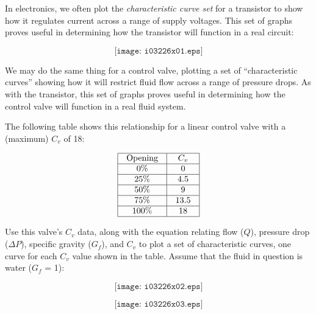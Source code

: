 

In electronics, we often plot the {\it characteristic curve set} for a transistor to show how it regulates current across a range of supply voltages.  This set of graphs proves useful in determining how the transistor will function in a real circuit:

$$\texttt{[image: i03226x01.eps]}$$

We may do the same thing for a control valve, plotting a set of ``characteristic curves'' showing how it will restrict fluid flow across a range of pressure drops.  As with the transistor, this set of graphs proves useful in determining how the control valve will function in a real fluid system.

The following table shows this relationship for a linear control valve with a (maximum) $C_v$ of 18:


$$\vbox{\offinterlineskip
\halign{\strut
\vrule \quad\hfil # \ \hfil & 
\vrule \quad\hfil # \ \hfil \vrule \cr
\noalign{\hrule}
%
Opening & $C_v$ \cr
%
\noalign{\hrule}
%
0\% & 0 \cr
%
\noalign{\hrule}
%
25\% & 4.5 \cr
%
\noalign{\hrule}
%
50\% & 9 \cr
%
\noalign{\hrule}
%
75\% & 13.5 \cr
%
\noalign{\hrule}
%
100\% & 18 \cr
%
\noalign{\hrule}
} %
}$$ %

Use this valve's $C_v$ data, along with the equation relating flow ($Q$), pressure drop ($\Delta P$), specific gravity ($G_f$), and $C_v$ to plot a set of characteristic curves, one curve for each $C_v$ value shown in the table.  Assume that the fluid in question is water ($G_f$ = 1):

$$\texttt{[image: i03226x02.eps]}$$







$$\texttt{[image: i03226x03.eps]}$$
 










